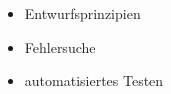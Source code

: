 \begin{frame}
    \begin{itemize}
        \item Entwurfsprinzipien
        \item Fehlersuche
        \item automatisiertes Testen
    \end{itemize}
\end{frame}